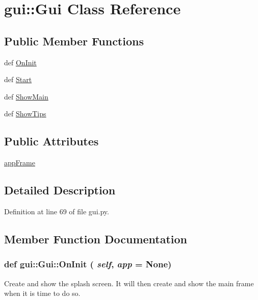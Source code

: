 \hypertarget{classgui_1_1Gui}{
\section{gui::Gui Class Reference}
\label{classgui_1_1Gui}
}
\subsection*{Public Member Functions}
\begin{DoxyCompactItemize}
\item 
def \hyperlink{classgui_1_1Gui_a063380e8fa617c69752ce2f071699a07}{OnInit}
\item 
def \hyperlink{classgui_1_1Gui_ae75ecf31b32e2df9c23baf87cf4a7c10}{Start}
\item 
def \hyperlink{classgui_1_1Gui_aa27add666d31a15ac8a5a2937e0bec70}{ShowMain}
\item 
def \hyperlink{classgui_1_1Gui_a530fc2229d33c71374c9c40217bcdda8}{ShowTips}
\end{DoxyCompactItemize}
\subsection*{Public Attributes}
\begin{DoxyCompactItemize}
\item 
\hyperlink{classgui_1_1Gui_a9a969f7b54f7e42900732a01995771ab}{appFrame}
\end{DoxyCompactItemize}


\subsection{Detailed Description}


Definition at line 69 of file gui.py.

\subsection{Member Function Documentation}
\hypertarget{classgui_1_1Gui_a063380e8fa617c69752ce2f071699a07}{
\subsubsection[{OnInit}]{\setlength{\rightskip}{0pt plus 5cm}def gui::Gui::OnInit ( {\em self}, \/   {\em app} = {\ttfamily None})}}
\label{classgui_1_1Gui_a063380e8fa617c69752ce2f071699a07}
\begin{DoxyVerb}
Create and show the splash screen.
It will then create and show the main frame when it is time to do so.
\end{DoxyVerb}
 

